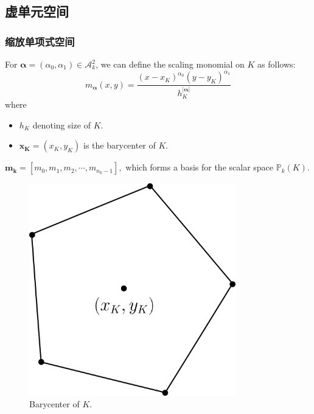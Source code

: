 \documentclass[notheorems,serif]{beamer}
\begin{document}
\subsection{虚单元空间}
\begin{frame}
    \frametitle{缩放单项式空间}
\begin{minipage}[b]{0.55\linewidth}
For $\boldsymbol{\alpha} = (\alpha_0, \alpha_1) \in \mathcal{A}_k^2$, 
we can define the scaling monomial on $K$ as follows:
$$
m_{\boldsymbol{\alpha}}(x, y) = \frac{(x - x_K)^{\alpha_0}(y -
y_K)^{\alpha_1}}{h_K^{|\boldsymbol{\alpha}|}}
$$
where
\begin{itemize}
    \item $h_K$ denoting size of $K$. 
    \item $\boldsymbol{x_K} = (x_K, y_K)$ is the barycenter of $K$.
\end{itemize}
$\boldsymbol{m_k} = [m_0, m_1, m_2, \cdots, m_{n_k-1}], $
which forms a basis for the scalar space $\mathbb{P}_k(K)$.
\end{minipage}
\hfill
\begin{minipage}[b]{0.4\linewidth}
    \centering
    \begin{figure}[htpb]
        \centering
        \includegraphics[width=0.8\textwidth]{../figures/polygon_K.png}
        \caption{Barycenter of $K$.}
    \end{figure}
\end{minipage}
\end{frame}
\end{document}
